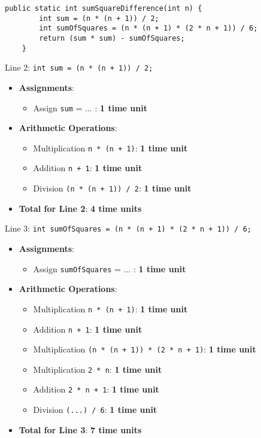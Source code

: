 \begin{example}
    
    \begin{lstlisting}[style=javaStyle, caption={Simple Function}, label={lst:java_simple_function}]
    public static int sumSquareDifference(int n) {
        int sum = (n * (n + 1)) / 2;
        int sumOfSquares = (n * (n + 1) * (2 * n + 1)) / 6;
        return (sum * sum) - sumOfSquares;
    }
    \end{lstlisting}

    Line 2: \texttt{int sum = (n * (n + 1)) / 2;}
    \begin{itemize}
        \item \textbf{Assignments}: 
            \begin{itemize}
                \item Assign \texttt{sum} = ... : \textbf{1 time unit}
            \end{itemize}
        \item \textbf{Arithmetic Operations}: 
            \begin{itemize}
                \item Multiplication \texttt{n * (n + 1)}: \textbf{1 time unit}
                \item Addition \texttt{n + 1}: \textbf{1 time unit}
                \item Division \texttt{(n * (n + 1)) / 2}: \textbf{1 time unit}
            \end{itemize}
        \item \textbf{Total for Line 2}: \textbf{4 time units}
    \end{itemize}

    Line 3: \texttt{int sumOfSquares = (n * (n + 1) * (2 * n + 1)) / 6;}
    \begin{itemize}
        \item \textbf{Assignments}:
            \begin{itemize}
                \item Assign \texttt{sumOfSquares} = ... : \textbf{1 time unit}
            \end{itemize}
        \item \textbf{Arithmetic Operations}: 
            \begin{itemize}
                \item Multiplication \texttt{n * (n + 1)}: \textbf{1 time unit}
                \item Addition \texttt{n + 1}: \textbf{1 time unit}
                \item Multiplication \texttt{(n * (n + 1)) * (2 * n + 1)}: \textbf{1 time unit}
                \item Multiplication \texttt{2 * n}: \textbf{1 time unit}
                \item Addition \texttt{2 * n + 1}: \textbf{1 time unit}
                \item Division \texttt{(...) / 6}: \textbf{1 time unit}
            \end{itemize}
        \item \textbf{Total for Line 3}: \textbf{7 time units}
    \end{itemize}


\end{example}
